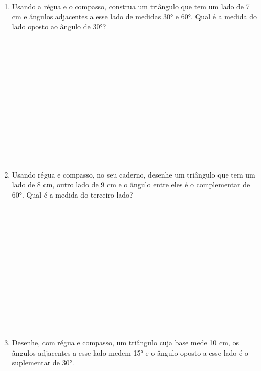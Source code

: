 \documentclass[a4paper,14pt]{article}
\begin{document}
\begin{multicols}{2}
\begin{enumerate}
			\item Usando a régua e o compasso, construa um triângulo que tem um lado de 7 cm e ângulos adjacentes a esse lado de medidas 30° e 60°. Qual é a medida do lado oposto ao ângulo de 30°? \\\\\\\\\\\\\\\\\\\\\\\\\\\\
			\item Usando régua e compasso, no seu caderno, desenhe um triângulo que tem um lado de 8 cm, outro lado de 9 cm e o ângulo entre eles é o complementar de 60°. Qual é a medida do terceiro lado? \\\\\\\\\\\\\\\\\\\\\\\\\\\\
			\item Desenhe, com régua e compasso, um triângulo cuja base mede 10 cm, os ângulos adjacentes a esse lado medem 15° e o ângulo oposto a esse lado é o suplementar de 30°. \\\\\\\\\\\\\\\\\\\\\\\\\\\\
			

\end{enumerate}
\end{multicols}
\end{document}
